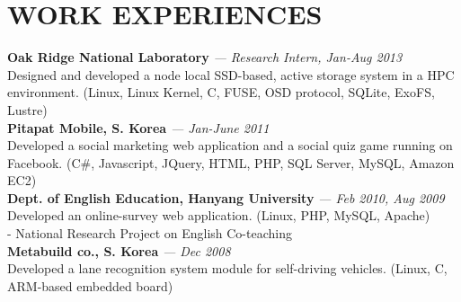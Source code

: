 \section{WORK EXPERIENCES} 
\vspace{0.07in} 
{\bf Oak Ridge National Laboratory}
{\it \footnotesize --- Research Intern, Jan-Aug 2013}\\
  Designed and developed a node local SSD-based, active storage system in a HPC
  environment.
  {\footnotesize (Linux, Linux Kernel, C, FUSE, OSD protocol, SQLite, ExoFS,
  Lustre)}
\vspace{0.03in}\\
{\bf Pitapat Mobile, S. Korea}
{\it \footnotesize --- Jan-June 2011}\\
  Developed a social marketing web application and a social quiz game running on
  Facebook.
  {\footnotesize(C\#, Javascript, JQuery, HTML, PHP, SQL Server, MySQL, Amazon
  EC2)}
\vspace{0.03in}\\
{\bf Dept. of English Education, Hanyang University}
{\it \footnotesize --- Feb 2010, Aug 2009}\\
  Developed an online-survey web application.
  {\footnotesize(Linux, PHP, MySQL, Apache)}\\
  - {\small National Research Project on English Co-teaching}
\vspace{0.03in}\\
{\bf Metabuild co., S. Korea}
{\it \footnotesize --- Dec 2008}\\
  Developed a lane recognition system module for self-driving vehicles.
  {\footnotesize(Linux, C, ARM-based embedded board)}

